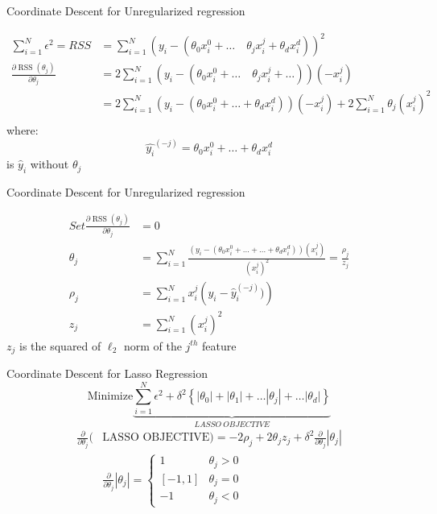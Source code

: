 \documentclass{beamer}
\begin{document}
\begin{frame}{Coordinate Descent for Unregularized regression}

\begin{align*}
\sum_{i=1}^{N}  \epsilon^{2}=RSS &=\sum_{i=1}^{N}\left(y_{i}-\left(\theta_{0}x_{i}^{0}+\ldots \quad \theta_{j} x_{i}^{j}+\theta_{d} x_{i}^{d}\right)\right)^{2}\\
\frac{\partial \operatorname{RSS}\left(\theta_{j}\right)}{\partial \theta_{j}}&= 2 \sum_{i=1}^{N}\left(y_{i}-\left(\theta_{0}x_{i}^{0}+\ldots \quad \theta_{j} x_{i}^{j}+\ldots \right)\right)\left(-x_{i}^{j}\right)\\
&=2\sum_{i=1}^{N}\left(y_{i}-\left(\theta_{0} x_{i}^{0}+\ldots + \theta_{d} x_{i}^{d}\right)\right)\left(-x_{i}^{j}\right)+2 \sum_{i=1}^{N} \theta_{j}(x_{i}^j)^2\\
\end{align*}
\pause where: $$\hat{y_{i}}^{(-j)} = \theta_{0} x_{i}^{0}+\ldots + \theta_{d} x_{i}^{d}$$ is $\hat{y}_{i}$ without $\theta_{j}$
\end{frame}

\begin{frame}{Coordinate Descent for Unregularized regression}

\begin{align*}
Set \frac{\partial \operatorname{RSS}\left(\theta_{j}\right)}{\partial \theta_{j}}&= 0\\
\theta_{j}&=\sum_{i=1}^{N} \frac{\left(y_{i}-\left(\theta_{0} x_{i}^{0}+\ldots + \ldots + \theta_{d}
x_{i}^{d}\right)\right)\left(x_{i}^{j}\right)}{\left(x_{i}^{j}\right)^{2}}= \frac{\rho_{j}}{z_{j}}\\
\rho_{j} &=\sum_{i=1}^{N} x_{i}^{j}\left(y_{i}-{\hat{y}_{i}^{(-j)}})\right)\\
z_{j}&=\sum_{i=1}^{N}\left(x_{i}^{j}\right)^{2}
\end{align*}
$z_{j}$ is the squared of $\ell_2$ norm of the $j^{th}$ feature
\end{frame}

{

}




\begin{frame}{Coordinate Descent for Lasso Regression}
\[
\text{Minimize} \underbrace{\sum_{i=1}^{N} \epsilon^{2} + \delta^{2}\left\{\left|\theta_{0}\right|+\left|\theta_{1}\right|+\ldots\left|\theta_{j}\right|+\ldots |\theta_{d}|\right\}}_{LASSO \: OBJECTIVE}
\]
\begin{align*}
\frac{\partial}{\partial \theta_{j}}(& \text {LASSO OBJECTIVE})=-2 \rho_{j}+2 \theta_{j} z_{j}+\delta^{2}{\frac{\partial}{\partial \theta_{j}}}\left|\theta_{j}\right|\\[18pt]
&\frac{\partial}{\partial \theta_{j}}\left|\theta_{j}\right|=\left\{\begin{array}{cc}
{1} & {\theta_{j}>0} \\
{[-1,1]} & {\theta_{j}=0} \\
{-1} & {\theta_{j}<0}
\end{array}\right.
\end{align*}
\end{frame}
\end{document}
